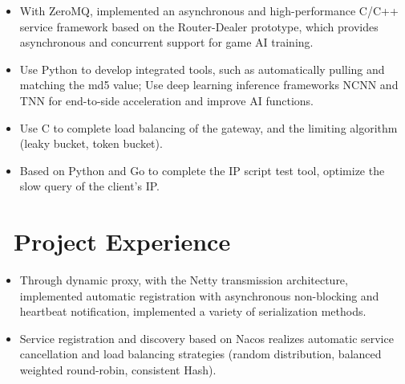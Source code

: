 \documentclass{resume}
\begin{document}
\begin{itemize}
  \item With ZeroMQ, implemented an asynchronous and high-performance C/C++ service framework based on the Router-Dealer prototype, which provides asynchronous and concurrent support for game AI training.
  \item Use Python to develop integrated tools, such as automatically pulling and matching the md5 value; Use deep learning inference frameworks NCNN and TNN for end-to-side acceleration and improve AI functions.
\end{itemize}
\vspace{-2.5ex}

\begin{itemize}
  \item Use C to complete load balancing of the gateway, and the limiting algorithm (leaky bucket, token bucket).
  \item Based on Python and Go to complete the IP script test tool, optimize the slow query of the client's IP.
\end{itemize}
\vspace{-1.5ex}

\section{\faUsers\ Project Experience}
\vspace{-0.5ex}
\begin{itemize}
  \item Through dynamic proxy, with the Netty transmission architecture, implemented automatic registration with asynchronous non-blocking and heartbeat notification, implemented a variety of serialization methods.
  \item Service registration and discovery based on Nacos realizes automatic service cancellation and load balancing strategies (random distribution, balanced weighted round-robin, consistent Hash).
\end{itemize}
\vspace{-2.5ex}
\end{document}
